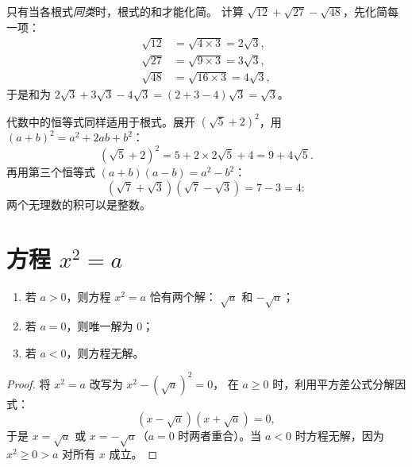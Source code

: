 \begin{example}[根式的加法]\label{ex:g9:sqrt:add}
只有当各根式\emph{同类}时，根式的和才能化简。
计算 $\sqrt{12} + \sqrt{27} - \sqrt{48}$，先化简每一项：
\begin{align*}
\sqrt{12} &= \sqrt{4 \times 3} = 2\sqrt3, \\
\sqrt{27} &= \sqrt{9 \times 3} = 3\sqrt3, \\
\sqrt{48} &= \sqrt{16 \times 3} = 4\sqrt3,
\end{align*}
于是和为 $2\sqrt3 + 3\sqrt3 - 4\sqrt3 = (2 + 3 - 4)\sqrt3 = \sqrt3$。
\end{example}

\begin{example}[根式的展开]\label{ex:g9:sqrt:expand}
代数中的恒等式同样适用于根式。展开
$\left(\sqrt5 + 2\right)^2$，用 $(a+b)^2 = a^2 + 2ab + b^2$：
\[
\left(\sqrt5 + 2\right)^2 = 5 + 2 \times 2\sqrt5 + 4 = 9 + 4\sqrt5 .
\]
再用第三个恒等式 $(a+b)(a-b) = a^2 - b^2$：
\[
\left(\sqrt7 + \sqrt3\right)\left(\sqrt7 - \sqrt3\right) = 7 - 3 = 4 :
\]
两个无理数的积可以是整数。
\end{example}

\section{方程 \texorpdfstring{$x^2 = a$}{x2 = a}}

\begin{theorem}[解方程 $x^2 = a$]\label{thm:g9:sqrt:equation}
\begin{enumerate}
  \item 若 $a > 0$，则方程 $x^2 = a$ 恰有两个解：
        $\sqrt a$ 和 $-\sqrt a$；
  \item 若 $a = 0$，则唯一解为 $0$；
  \item 若 $a < 0$，则方程无解。
\end{enumerate}
\end{theorem}

\begin{proof}
将 $x^2 = a$ 改写为 $x^2 - \left(\sqrt a\right)^2 = 0$，
在 $a \geq 0$ 时，利用平方差公式分解因式：
\[
\left(x - \sqrt a\right)\left(x + \sqrt a\right) = 0 ,
\]
于是 $x = \sqrt a$ 或 $x = -\sqrt a$（$a = 0$ 时两者重合）。当
$a < 0$ 时方程无解，因为 $x^2 \geq 0 > a$ 对所有 $x$ 成立。
\end{proof}

